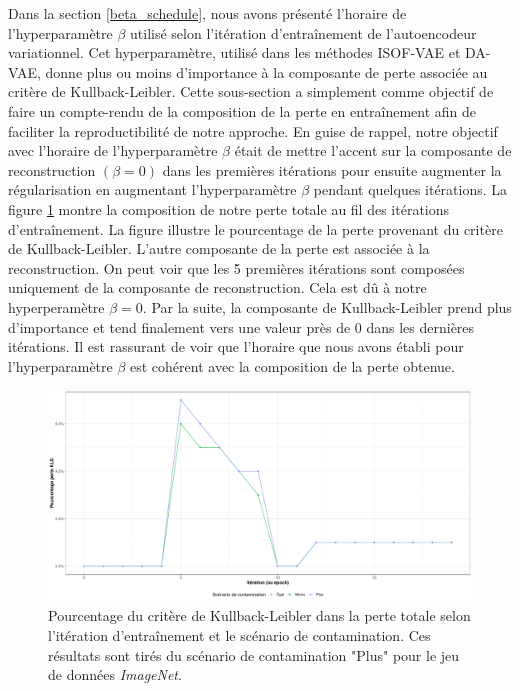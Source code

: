 Dans la section \ref{beta_schedule}, nous avons présenté l'horaire de l'hyperparamètre $\beta$ utilisé selon l'itération d'entraînement de l'autoencodeur variationnel. Cet hyperparamètre, utilisé dans les méthodes ISOF-VAE et DA-VAE, donne plus ou moins d'importance à la composante de perte associée au critère de Kullback-Leibler. Cette sous-section a simplement comme objectif de faire un compte-rendu de la composition de la perte en entraînement afin de faciliter la reproductibilité de notre approche. En guise de rappel, notre objectif avec l'horaire de l'hyperparamètre $\beta$ était de mettre l'accent sur la composante de reconstruction $(\beta = 0)$ dans les premières itérations pour ensuite augmenter la régularisation en augmentant l'hyperparamètre $\beta$ pendant quelques itérations. La figure \ref{fig:cars_kld_perc} montre la composition de notre perte totale au fil des itérations d'entraînement. La figure illustre le pourcentage de la perte provenant du critère de Kullback-Leibler. L'autre composante de la perte est associée à la reconstruction. On peut voir que les 5 premières itérations sont composées uniquement de la composante de reconstruction. Cela est dû à notre hyperperamètre $\beta=0$. Par la suite, la composante de Kullback-Leibler prend plus d'importance et tend finalement vers une valeur près de 0 dans les dernières itérations. Il est rassurant de voir que l'horaire que nous avons établi pour l'hyperparamètre $\beta$ est cohérent avec la composition de la perte obtenue.

\begin{figure}[H]
	\centering
	\includegraphics[width=\linewidth]{images/kld_cars.pdf}
	\DIFdelbeginFL %
\DIFdelendFL \DIFaddbeginFL \caption[Pourcentage du critère de Kullback-Leibler dans la perte totale selon l'itération d'entraînement et le scénario de contamination.]{\DIFaddendFL Pourcentage du critère de Kullback-Leibler dans la perte totale selon l'itération d'entraînement et le scénario de contamination. Ces résultats sont tirés du scénario de contamination "Plus" pour le jeu de données \textit{ImageNet}.}
	\label{fig:cars_kld_perc}
\end{figure}


